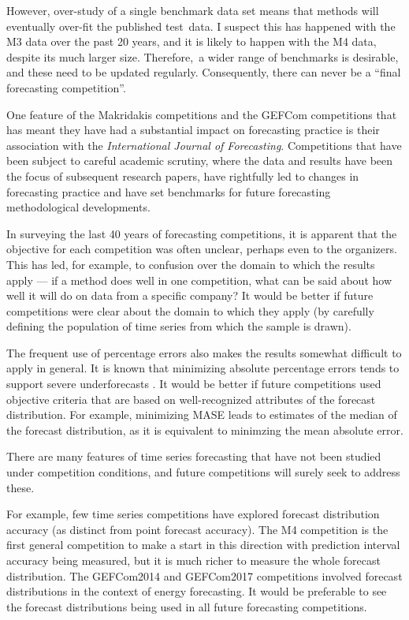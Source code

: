 \documentclass[11pt,a4paper,]{article}
\begin{document}
However, over-study of a single benchmark data set means that methods will eventually over-fit the published test~data. I suspect this has happened with the M3 data over the past 20 years, and it is likely to happen with the M4 data, despite its much larger size. Therefore,~a wider range of benchmarks is desirable, and these need to be updated regularly. Consequently, there can never be a ``final forecasting competition''.

One feature of the Makridakis competitions and the GEFCom competitions that has meant they have had a substantial impact on forecasting practice is their association with the \emph{International Journal of Forecasting}. Competitions that have been subject to careful academic scrutiny, where the data and results have been the focus of subsequent research papers, have rightfully led to changes in forecasting practice and have set benchmarks for future forecasting methodological developments.

In surveying the last 40 years of forecasting competitions, it is apparent that the objective for each competition was often unclear, perhaps even to the organizers. This has led, for example, to confusion over the domain to which the results apply --- if a method does well in one competition, what can be said about how well it will do on data from a specific company? It would be better if future competitions were clear about the domain to which they apply (by carefully defining the population of time series from which the sample is drawn).

The frequent use of percentage errors also makes the results somewhat difficult to apply in general. It is known that minimizing absolute percentage errors tends to support severe underforecasts \autocite{Gneiting2011}. It would be better if future competitions used objective criteria that are based on well-recognized attributes of the forecast distribution. For example, minimizing MASE \autocite{HK06} leads to estimates of the median of the forecast distribution, as it is equivalent to minimzing the mean absolute error.

There are many features of time series forecasting that have not been studied under competition conditions, and future competitions will surely seek to address these.

For example, few time series competitions have explored forecast distribution accuracy (as distinct from point forecast accuracy). The M4 competition is the first general competition to make a start in this direction with prediction interval accuracy being measured, but it is much richer to measure the whole forecast distribution. The GEFCom2014 and GEFCom2017 competitions involved forecast distributions in the context of energy forecasting. It would be preferable to see the forecast distributions being used in all future forecasting competitions.
\end{document}
